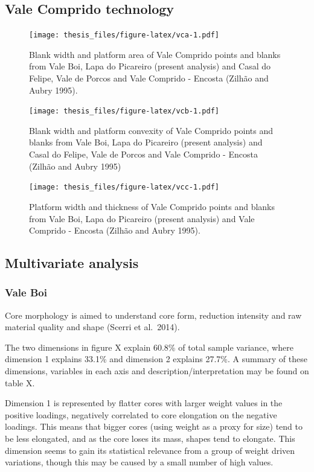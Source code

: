 \documentclass[12pt,twoside]{reedthesis}
\begin{document}
\hypertarget{vale-comprido-technology}{%
\subsection{Vale Comprido technology}\label{vale-comprido-technology}}
\begin{figure}
\centering
\texttt{[image: thesis\_files/figure-latex/vca-1.pdf]}
\caption{\label{fig:vca}Blank width and platform area of Vale Comprido points and blanks from Vale Boi, Lapa do Picareiro (present analysis) and Casal do Felipe, Vale de Porcos and Vale Comprido - Encosta (Zilhão and Aubry 1995).}
\end{figure}
\begin{figure}
\centering
\texttt{[image: thesis\_files/figure-latex/vcb-1.pdf]}
\caption{\label{fig:vcb}Blank width and platform convexity of Vale Comprido points and blanks from Vale Boi, Lapa do Picareiro (present analysis) and Casal do Felipe, Vale de Porcos and Vale Comprido - Encosta (Zilhão and Aubry 1995)}
\end{figure}
\begin{figure}
\centering
\texttt{[image: thesis\_files/figure-latex/vcc-1.pdf]}
\caption{\label{fig:vcc}Platform width and thickness of Vale Comprido points and blanks from Vale Boi, Lapa do Picareiro (present analysis) and Vale Comprido - Encosta (Zilhão and Aubry 1995).}
\end{figure}
\hypertarget{multivariate-analysis}{%
\subsection{Multivariate analysis}\label{multivariate-analysis}}

\hypertarget{vale-boi-7}{%
\subsubsection{Vale Boi}\label{vale-boi-7}}

Core morphology is aimed to understand core form, reduction intensity and raw material quality and shape (Scerri et al.~2014).

The two dimensions in figure X explain 60.8\% of total sample variance, where dimension 1 explains 33.1\% and dimension 2 explains 27.7\%. A summary of these dimensions, variables in each axis and description/interpretation may be found on table X.

Dimension 1 is represented by flatter cores with larger weight values in the positive loadings, negatively correlated to core elongation on the negative loadings. This means that bigger cores (using weight as a proxy for size) tend to be less elongated, and as the core loses its mass, shapes tend to elongate. This dimension seems to gain its statistical relevance from a group of weight driven variations, though this may be caused by a small number of high values.
\end{document}

